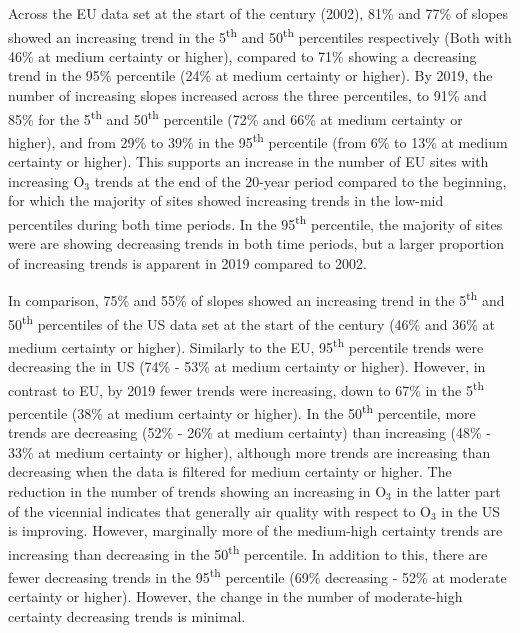 \documentclass[journal abbreviation, manuscript]{copernicus}
\begin{document}
Across the EU data set at the start of the century (2002), 81\% and 77\% of slopes showed an increasing trend in the 5\textsuperscript{th} and 50\textsuperscript{th} percentiles respectively (Both with 46\% at medium certainty or higher), compared to 71\% showing a decreasing trend in the 95\% percentile (24\% at medium certainty or higher). By 2019, the number of increasing slopes increased across the three percentiles, to 91\% and 85\% for the 5\textsuperscript{th} and 50\textsuperscript{th} percentile (72\% and 66\% at medium certainty or higher), and from 29\% to 39\% in the 95\textsuperscript{th} percentile (from 6\% to 13\% at medium certainty or higher). This supports an increase in the number of EU sites with increasing O$_3$ trends at the end of the 20-year period compared to the beginning, for which the majority of sites showed increasing trends in the low-mid percentiles during both time periods. In the 95\textsuperscript{th} percentile, the majority of sites were are showing decreasing trends in both time periods, but a larger proportion of increasing trends is apparent in 2019 compared to 2002. 

In comparison, 75\%  and 55\% of slopes showed an increasing trend in the 5\textsuperscript{th} and 50\textsuperscript{th} percentiles of the US data set at the start of the century (46\% and 36\% at medium certainty or higher). Similarly to the EU, 95\textsuperscript{th} percentile trends were decreasing the in US (74\% - 53\% at medium certainty or higher). However, in contrast to EU, by 2019 fewer trends were increasing, down to 67\% in the 5\textsuperscript{th} percentile (38\% at medium certainty or higher). In the 50\textsuperscript{th} percentile, more trends are decreasing (52\% - 26\% at medium certainty) than increasing (48\% - 33\% at medium certainty or higher), although more trends are increasing than decreasing when the data is filtered for medium certainty or higher. The reduction in the number of trends showing an increasing in O$_3$ in the latter part of the vicennial indicates that generally air quality with respect to O$_3$ in the US is improving. However, marginally more of the medium-high certainty trends are increasing than decreasing in the 50\textsuperscript{th} percentile. In addition to this, there are fewer decreasing trends in the 95\textsuperscript{th} percentile (69\% decreasing - 52\% at moderate certainty or higher). However, the change in the number of moderate-high certainty decreasing trends is minimal.
\end{document}
